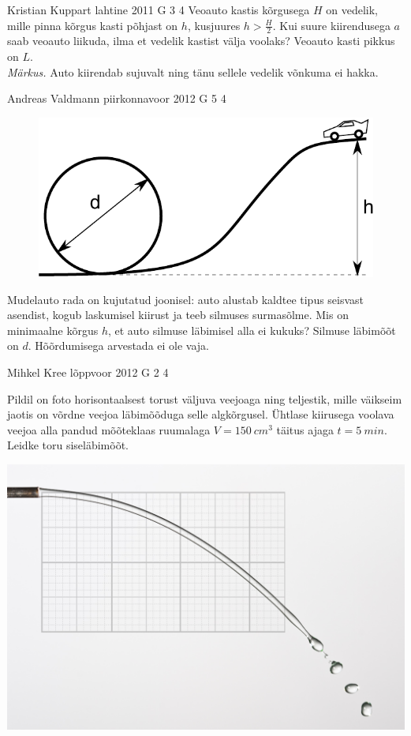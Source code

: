 \documentclass[11pt, twoside]{article}
\begin{document}
{%
{Kristian Kuppart} %
{lahtine} %
{2011} %
{G 3} %
{4} %
{
\ifStatement
Veoauto kastis kõrgusega $H$ on vedelik, mille pinna kõrgus kasti põhjast on 
$h$, kusjuures $h > \frac{H}{2}$. Kui suure kiirendusega $a$ saab veoauto 
liikuda, ilma et vedelik kastist välja voolaks? Veoauto kasti pikkus on $L$.\\
\textit{Märkus.} Auto kiirendab sujuvalt ning tänu sellele vedelik võnkuma ei hakka.
\fi
}

{Andreas Valdmann} %
{piirkonnavoor} %
{2012} %
{G 5} %
{4} %
{
\ifStatement
\begin{figure}%
\includegraphics[width=\linewidth]{2012-v2g-05-silmus}%
\end{figure}
Mudelauto rada on kujutatud joonisel: auto alustab kaldtee tipus seisvast
asendist, kogub laskumisel kiirust ja teeb silmuses surmasõlme. Mis on
minimaalne kõrgus $h$, et auto silmuse läbimisel alla ei kukuks? Silmuse
läbimõõt on $d$. Hõõrdumisega arvestada ei ole vaja.
\fi
}

{Mihkel Kree} %
{lõppvoor} %
{2012} %
{G 2} %
{4} %
{
\ifStatement
Pildil on foto horisontaalsest torust väljuva veejoaga ning teljestik, mille
väikseim jaotis on võrdne veejoa läbimõõduga selle algkõrgusel. Ühtlase
kiirusega voolava veejoa alla pandud mõõteklaas ruumalaga
$V=\SI{150}{cm^3}$ täitus ajaga $t=\SI{5}{min}$. Leidke
toru siseläbimõõt.
\begin{center}
\includegraphics[width=0.7\linewidth]{2012-v3g-02-jet}%
\end{center}
\fi
}

}
\end{document}
